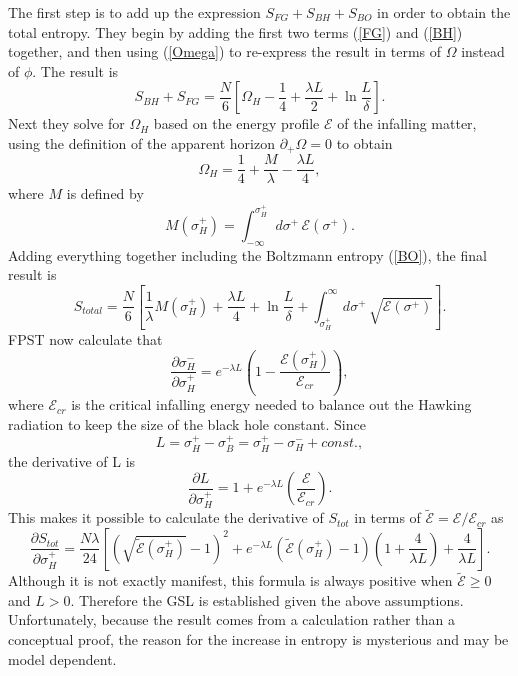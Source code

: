 \documentclass{article}
\begin{document}
The first step is to add up the expression $S_{FG} + S_{BH} + S_{BO}$ in order to obtain the total entropy.  They begin by adding the first two terms (\ref{FG}) and (\ref{BH}) together, and then using (\ref{Omega}) to re-express the result in terms of $\Omega$ instead of $\phi$.  The result is
\begin{equation}\label{two}
S_{BH} + S_{FG} = \frac{N}{6} \left[ 
\Omega_H - \frac{1}{4} + \frac{\lambda L}{2} + \ln \frac{L}{\delta}
\right].
\end{equation}
Next they solve for $\Omega_H$ based on the energy profile $\mathcal{E}$ of the infalling matter, using the definition of the apparent horizon $\partial_{+} \Omega = 0$ to obtain
\begin{equation}
\Omega_H = \frac{1}{4} + \frac{M}{\lambda} - \frac{\lambda L}{4},
\end{equation}
where $M$ is defined by
\begin{equation}
M(\sigma^{+}_H) = \int^{\sigma^{+}_H}_{-\infty} d\sigma^{+}\,\mathcal{E}(\sigma^{+}).
\end{equation}
Adding everything together including the Boltzmann entropy (\ref{BO}), the final result is
\begin{equation}
S_{total} = \frac{N}{6} \left[ 
\frac{1}{\lambda} M(\sigma^{+}_H) + \frac{\lambda L}{4} + \ln \frac{L}{\delta}
+ \int^{\infty}_{\sigma^{+}_H} d\sigma^{+}\,\sqrt{\mathcal{E}(\sigma^{+})}
\right].
\end{equation}
FPST now calculate that
\begin{equation}
\frac{\partial \sigma^{-}_H}{\partial \sigma^{+}_H} = 
e^{-\lambda L} \left( 1 - \frac{\mathcal{E}(\sigma^{+}_H)}{\mathcal{E}_{cr}} \right),
\end{equation}
where $\mathcal{E}_{cr}$ is the critical infalling energy needed to balance out the Hawking radiation to keep the size of the black hole constant.  Since
\begin{equation}
L = \sigma^{+}_H - \sigma^{+}_B = \sigma^{+}_H - \sigma^{-}_H + const.,
\end{equation}
the derivative of L is
\begin{equation}
\frac{\partial L}{\partial \sigma^{+}_H} = 
1 + e^{-\lambda L} \left( \frac{\mathcal{E}}{\mathcal{E}_{cr}} \right).
\end{equation}
This makes it possible to calculate the derivative of $S_{tot}$ in terms of 
$\tilde{\mathcal{E}} = \mathcal{E} / \mathcal{E}_{cr}$
as
\begin{equation}
\frac{\partial S_{tot}}{\partial \sigma^{+}_H} =
\frac{N \lambda}{24} \left[
(\sqrt{\tilde{\mathcal{E}}(\sigma^{+}_H)} - 1)^2 + 
e^{-\lambda L} (\tilde{\mathcal{E}}(\sigma^{+}_H) - 1)
\left( 1 + \frac{4}{\lambda L} \right) + \frac{4}{\lambda L} \right].
\end{equation}
Although it is not exactly manifest, this formula is always positive when 
$\tilde{\mathcal{E}} \ge 0$ and $L > 0$.  Therefore the GSL is established given the above assumptions.  Unfortunately, because the result comes from a calculation rather than a conceptual proof, the reason for the increase in entropy is mysterious and may be model dependent.
\end{document}
